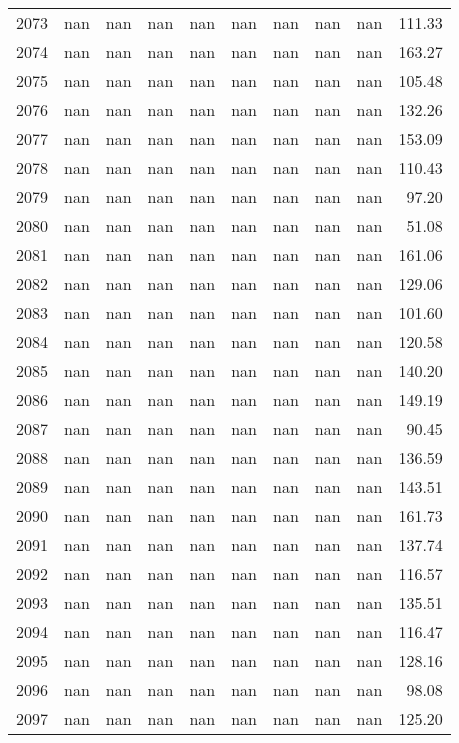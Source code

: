\begin{tabular}{lrrrrrrrrr}
2073 & nan & nan & nan & nan & nan & nan & nan & nan & 111.33 \\
2074 & nan & nan & nan & nan & nan & nan & nan & nan & 163.27 \\
2075 & nan & nan & nan & nan & nan & nan & nan & nan & 105.48 \\
2076 & nan & nan & nan & nan & nan & nan & nan & nan & 132.26 \\
2077 & nan & nan & nan & nan & nan & nan & nan & nan & 153.09 \\
2078 & nan & nan & nan & nan & nan & nan & nan & nan & 110.43 \\
2079 & nan & nan & nan & nan & nan & nan & nan & nan & 97.20 \\
2080 & nan & nan & nan & nan & nan & nan & nan & nan & 51.08 \\
2081 & nan & nan & nan & nan & nan & nan & nan & nan & 161.06 \\
2082 & nan & nan & nan & nan & nan & nan & nan & nan & 129.06 \\
2083 & nan & nan & nan & nan & nan & nan & nan & nan & 101.60 \\
2084 & nan & nan & nan & nan & nan & nan & nan & nan & 120.58 \\
2085 & nan & nan & nan & nan & nan & nan & nan & nan & 140.20 \\
2086 & nan & nan & nan & nan & nan & nan & nan & nan & 149.19 \\
2087 & nan & nan & nan & nan & nan & nan & nan & nan & 90.45 \\
2088 & nan & nan & nan & nan & nan & nan & nan & nan & 136.59 \\
2089 & nan & nan & nan & nan & nan & nan & nan & nan & 143.51 \\
2090 & nan & nan & nan & nan & nan & nan & nan & nan & 161.73 \\
2091 & nan & nan & nan & nan & nan & nan & nan & nan & 137.74 \\
2092 & nan & nan & nan & nan & nan & nan & nan & nan & 116.57 \\
2093 & nan & nan & nan & nan & nan & nan & nan & nan & 135.51 \\
2094 & nan & nan & nan & nan & nan & nan & nan & nan & 116.47 \\
2095 & nan & nan & nan & nan & nan & nan & nan & nan & 128.16 \\
2096 & nan & nan & nan & nan & nan & nan & nan & nan & 98.08 \\
2097 & nan & nan & nan & nan & nan & nan & nan & nan & 125.20 \\

\end{tabular}
